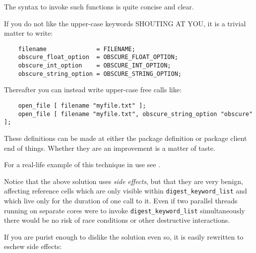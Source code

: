 The syntax to invoke such functions is quite concise and clear.

If you do not like the upper-case keywords {\sc SHOUTING AT YOU}, it is 
a trivial matter to write:

\begin{verbatim}
    filename              = FILENAME;
    obscure_float_option  = OBSCURE_FLOAT_OPTION;
    obscure_int_option    = OBSCURE_INT_OPTION;
    obscure_string_option = OBSCURE_STRING_OPTION;
\end{verbatim}

Thereafter you can instead write upper-case free calls like:

\begin{verbatim}
    open_file [ filename "myfile.txt" ];
    open_file [ filename "myfile.txt", obscure_string_option "obscure" ];
\end{verbatim}

These definitions can be made at either the package definition or package client end 
of things.  Whether they are an improvement is a matter of taste.

For a real-life example of this technique in use see 
.


Notice that the above solution uses {\it side effects}, but that they are 
very benign, affecting reference cells which are only visible within 
{\tt digest\_keyword\_list} and which live only for the duration of one call to it. 
Even if two parallel threads running on separate cores were to invoke 
{\tt digest\_keyword\_list} simultaneously there would be no risk of 
race conditions or other destructive interactions.

If you are purist enough to dislike the solution even so, it is easily 
rewritten to eschew side effects:

